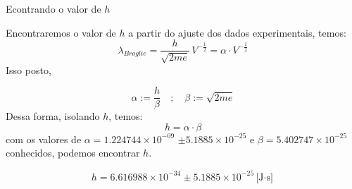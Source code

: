 \begin{frame}{Econtrando o valor de $h$}

Encontraremos o valor de $h$ a partir do ajuste dos dados experimentais, temos:
\begin{equation}
\lambda_{Broglie} = \frac{h}{\sqrt{2 m e}} \, V^{-\tfrac{1}{2}} = \alpha \cdot V^{-\tfrac{1}{2}}
\end{equation}
\indent Isso posto,

\begin{equation}
\alpha := \frac{h}{\beta} \quad ; \quad \beta := \sqrt{2 m e}
\end{equation}
\indent Dessa forma, isolando $h$, temos:
\begin{equation}
h = \alpha \cdot \beta
\end{equation}
com os valores de $\alpha = 1.224744 \times 10^{-09}$ $\pm 5.1885 \times 10^{-25}
$ e $\beta = 5.402747 \times 10^{-25}$ conhecidos, podemos encontrar $h$.

\begin{equation}
        h =  6.616988 \times 10^{-34} \pm 5.1885 \times 10^{-25} \text{[J$\cdot$s]}
\end{equation}

\end{frame}

